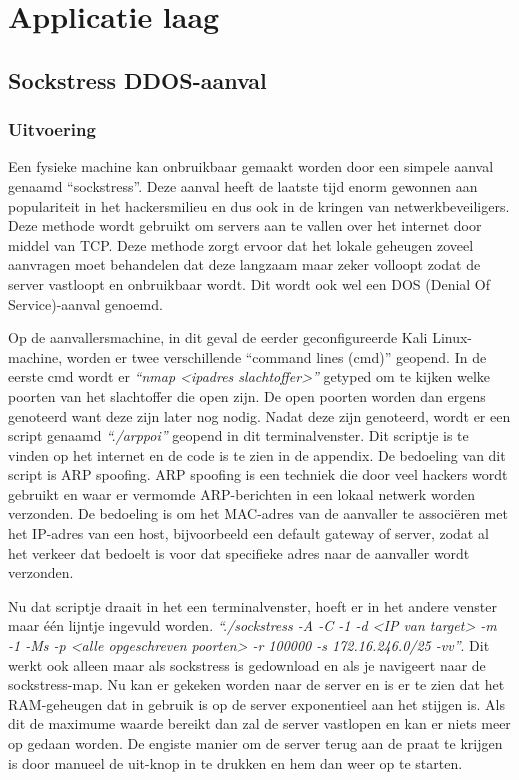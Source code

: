 \documentclass[pdftex,a4paper,12pt]{report}
\begin{document}
\section{Applicatie laag}
\subsection{Sockstress DDOS-aanval}
\subsubsection{Uitvoering}
Een fysieke machine kan onbruikbaar gemaakt worden door een simpele aanval genaamd "`sockstress"'. Deze aanval heeft de laatste tijd enorm gewonnen aan populariteit in het hackersmilieu en dus ook in de kringen van netwerkbeveiligers. Deze methode wordt gebruikt om servers aan te vallen over het internet door middel van TCP. Deze methode zorgt ervoor dat het lokale geheugen zoveel aanvragen moet behandelen dat deze langzaam maar zeker volloopt zodat de server vastloopt en onbruikbaar wordt. Dit wordt ook wel een DOS (Denial Of Service)-aanval genoemd. \newline 

Op de aanvallersmachine, in dit geval de eerder geconfigureerde Kali Linux-machine, worden er twee verschillende "`command lines (cmd)"' geopend. In de eerste cmd wordt er \textit{"`nmap <ipadres slachtoffer>"'} getyped om te kijken welke poorten van het slachtoffer die open zijn. De open poorten worden dan ergens genoteerd want deze zijn later nog nodig. Nadat deze zijn genoteerd, wordt er een script genaamd \textit{"`./arppoi"'} geopend in dit terminalvenster. Dit scriptje is te vinden op het internet en de code is te zien in de appendix. De bedoeling van dit script is ARP spoofing. ARP spoofing is een techniek die door veel hackers wordt gebruikt en waar er vermomde ARP-berichten in een lokaal netwerk worden verzonden. De bedoeling is om het MAC-adres van de aanvaller te associëren met het IP-adres van een host, bijvoorbeeld een default gateway of server, zodat al het verkeer dat bedoelt is voor dat specifieke adres naar de aanvaller wordt verzonden. \newline 

Nu dat scriptje draait in het een terminalvenster, hoeft er in het andere venster maar één lijntje ingevuld worden. \textit{"`./sockstress -A -C -1 -d <IP van target> -m -1 -Ms -p <alle opgeschreven poorten> -r 100000 -s 172.16.246.0/25 -vv"'}. Dit werkt ook alleen maar als sockstress is gedownload en als je navigeert naar de sockstress-map. Nu kan er gekeken worden naar de server en is er te zien dat het RAM-geheugen dat in gebruik is op de server exponentieel aan het stijgen is. Als dit de maximume waarde bereikt dan zal de server vastlopen en kan er niets meer op gedaan worden. De engiste manier om de server terug aan de praat te krijgen is door manueel de uit-knop in te drukken en hem dan weer op te starten.
\end{document}
